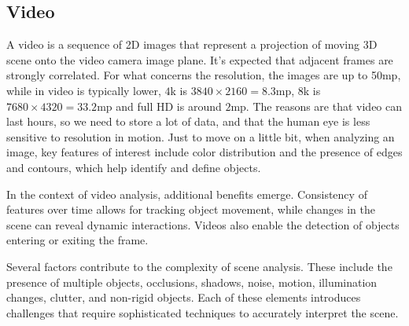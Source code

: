 \subsection{Video}
A video is a sequence of 2D images that represent a projection of moving 3D scene onto the video camera image plane. It's expected that adjacent frames are strongly correlated.
For what concerns the resolution, the images are up to 50mp, while in video is typically lower, $4$k is $3840\times2160=8.3$mp, $8$k is $7680\times4320=33.2$mp and full HD is around $2$mp.
The reasons are that video can last hours, so we need to store a lot of data, and that the human eye is less sensitive to resolution in motion. 
Just to move on a little bit, when analyzing an image, key features of interest include color distribution and the presence of edges and contours, which help identify and define objects.

In the context of video analysis, additional benefits emerge. Consistency of features over time allows for tracking object movement, while changes in the scene can reveal dynamic interactions. Videos also enable the detection of objects entering or exiting the frame.

Several factors contribute to the complexity of scene analysis. These include the presence of multiple objects, occlusions, shadows, noise, motion, illumination changes, clutter, and non-rigid objects. Each of these elements introduces challenges that require sophisticated techniques to accurately interpret the scene.
